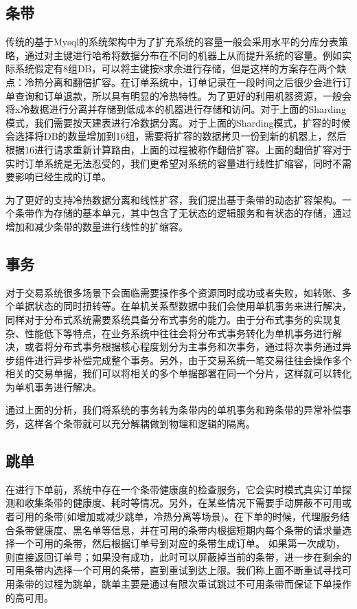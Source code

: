 \documentclass[letterpaper,twocolumn,10pt]{article}
\begin{document}
\subsection{条带}
传统的基于Mysql的系统架构中为了扩充系统的容量一般会采用水平的分库分表策略，通过对主键进行哈希将数据分布在不同的机器上从而提升系统的容量。例如实际系统假定有8组DB，可以将主键按8求余进行存储，但是这样的方案存在两个缺点：冷热分离和翻倍扩容。在订单系统中，订单记录在一段时间之后很少会进行订单查询和订单退款，所以具有明显的冷热特性。为了更好的利用机器资源，一般会将x冷数据进行分离并存储到低成本的机器进行存储和访问。对于上面的Sharding模式，我们需要按天建表进行冷数据分离。对于上面的Sharding模式，扩容的时候会选择将DB的数量增加到16组，需要将扩容的数据拷贝一份到新的机器上，然后根据16进行请求重新计算路由，上面的过程被称作翻倍扩容。上面的翻倍扩容对于实时订单系统是无法忍受的，我们更希望对系统的容量进行线性扩缩容，同时不需要影响已经生成的订单。

为了更好的支持冷热数据分离和线性扩容，我们提出基于条带的动态扩容架构。一个条带作为存储的基本单元，其中包含了无状态的逻辑服务和有状态的存储，通过增加和减少条带的数量进行线性的扩缩容。

\subsection{事务}
对于交易系统很多场景下会面临需要操作多个资源同时成功或者失败，如转账、多个单据状态的同时扭转等。在单机关系型数据中我们会使用单机事务来进行解决，同样对于分布式系统需要系统具备分布式事务的能力。由于分布式事务的实现复杂、性能低下等特点，在业务系统中往往会将分布式事务转化为单机事务进行解决，或者将分布式事务根据核心程度划分为主事务和次事务，通过将次事务通过异步组件进行异步补偿完成整个事务。另外，由于交易系统一笔交易往往会操作多个相关的交易单据，我们可以将相关的多个单据部署在同一个分片，这样就可以转化为单机事务进行解决。

通过上面的分析，我们将系统的事务转为条带内的单机事务和跨条带的异常补偿事务，这样各个条带就可以充分解耦做到物理和逻辑的隔离。

\subsection{跳单}
在进行下单前，系统中存在一个条带健康度的检查服务，它会实时模式真实订单探测和收集条带的健康度、耗时等情况。另外，在某些情况下需要手动屏蔽不可用或者可用的条带(如增加或减少跳单，冷热分离等场景)。在下单的时候，代理服务结合条带健康度、黑名单等信息，并在可用的条带内根据短期内每个条带的请求量选择一个可用的条带，然后根据订单号到对应的条带生成订单。
如果第一次成功，则直接返回订单号；如果没有成功，此时可以屏蔽掉当前的条带，进一步在剩余的可用条带内选择一个可用的条带，直到重试到达上限。我们称上面不断重试寻找可用条带的过程为跳单，跳单主要是通过有限次重试跳过不可用条带而保证下单操作的高可用。
\end{document}
